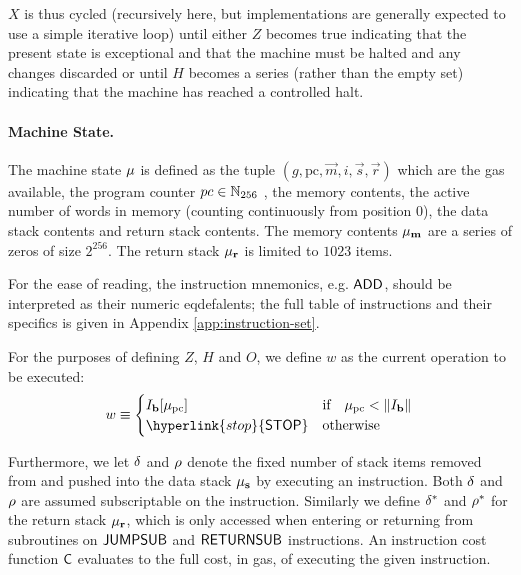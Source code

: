 $X$ is thus cycled (recursively here, but implementations are generally expected to use a simple iterative loop) until either \hyperlink{zhalt}{$Z$} becomes true indicating that the present state is exceptional and that the machine must be halted and any changes discarded or until \hyperlink{hhalt}{$H$} becomes a series (rather than the empty set) indicating that the machine has reached a controlled halt.

\paragraph{Machine State.}
The machine state $\mathbf{\mu}$ is defined as the tuple $(g, \mathrm{pc}, \vec{m}, i, \vec{s},\vec{r})$ which are the gas available, the program counter $pc \in \mathbb{N}_{256}$ , the memory contents, the active number of words in memory (counting continuously from position 0), the data stack contents and return stack contents. 
The memory contents $\mathbf{\mu}_{\mathbf{m}}$ are a series of zeros of size $2^{256}$.
The return stack $\mathbf{\mu}_{\mathbf{r}}$ is limited to $1023$ items.

For the ease of reading, the instruction mnemonics, e.g. $\mathsf{ADD}$, should be interpreted as their numeric eqdefalents; the full table of instructions and their specifics is given in Appendix \ref{app:instruction-set}.

For the purposes of defining $Z$, $H$ and $O$, we define $w$ as the current operation to be executed:
\begin{equation}\label{eq:currentoperation}
w \eqdef 
	\begin{cases} 
		I_{\vec{b}}[\mst_{\mathrm{pc}}] & \text{if} \quad \mst_{\mathrm{pc}} < \lVert I_{\vec{b}} \rVert \\
		\hyperlink{stop}{\op{STOP}} & \text{otherwise}
	\end{cases}
\end{equation}

Furthermore, we let $\mathbf{\delta}$ and $\mathbf{\rho}$ denote the fixed number of stack items removed from and pushed into the data stack $\mathbf{\mu}_{\mathbf{s}}$ by executing an instruction.
Both $\mathbf{\delta}$ and $\mathbf{\rho}$ are assumed subscriptable on the instruction. 
Similarly we define $\mathbf{\delta}^*$ and $\mathbf{\rho}^*$ for the return stack $\mathbf{\mu}_{\mathbf{r}}$, which is only accessed when entering or returning from subroutines on $\mathsf{JUMPSUB}$ and $\mathsf{RETURNSUB}$ instructions. 
An instruction cost function $\mathsf{C}$ evaluates to the full cost, in gas, of executing the given instruction.

